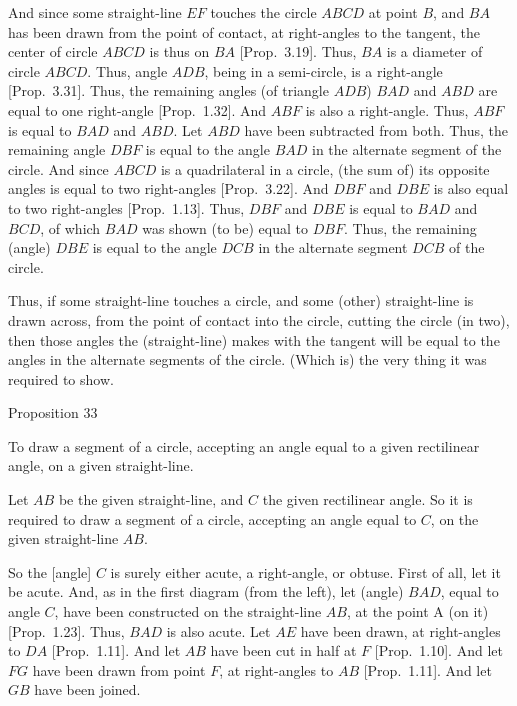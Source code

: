 And since some straight-line $EF$ touches the circle $ABCD$ at point $B$, and
$BA$ has been drawn from the point of contact, at right-angles to the
tangent, the center of circle $ABCD$ is thus on $BA$ [Prop.~3.19].
Thus, $BA$ is a diameter of circle $ABCD$.
Thus, angle $ADB$, being in a semi-circle, is a right-angle [Prop.~3.31].
Thus, the remaining angles (of triangle $ADB$) $BAD$ and $ABD$ are equal to one right-angle [Prop.~1.32]. And $ABF$ is also a right-angle. Thus,
$ABF$ is equal to $BAD$ and $ABD$. Let $ABD$ have been subtracted from both.
Thus, the remaining angle $DBF$ is equal to the angle $BAD$ in the alternate
segment of the circle. And since $ABCD$ is a quadrilateral in a circle,
(the sum of) its opposite angles is equal to two right-angles [Prop.~3.22]. And $DBF$ and $DBE$ is also equal to two right-angles [Prop.~1.13]. Thus, $DBF$ and $DBE$ is equal to $BAD$ and $BCD$, of which
$BAD$ was shown (to be) equal to $DBF$. Thus, the remaining (angle) $DBE$ is
equal to the angle $DCB$ in the alternate segment $DCB$ of the circle.

Thus, if some straight-line touches a circle, and some (other) straight-line is drawn  across, from the point of contact into the circle,  cutting the circle (in two), then those angles  the (straight-line) makes
with the tangent will be equal to the angles in
the alternate segments of the circle. (Which is) the very thing it was required to
show.


\begin{center}
{\large Proposition 33}
\end{center}

To draw a segment of a circle, accepting an angle equal to a given rectilinear angle, on a given straight-line.

\epsfysize=1.53in
\centerline{}

Let $AB$ be the given straight-line, and $C$ the given rectilinear angle. So
it is required to draw a segment of a circle, accepting an angle equal to $C$,
on the given straight-line $AB$.

So the [angle] $C$ is surely either acute, a right-angle, or obtuse. First of all,
let it be acute. And, as in the first diagram (from the left), let (angle) $BAD$,
equal to angle $C$,  have been
constructed  on the straight-line $AB$,  at the point A (on it)
[Prop.~1.23]. Thus, $BAD$ is also acute. Let $AE$ have been drawn, at
right-angles to $DA$ [Prop.~1.11]. And let $AB$ have been cut in half
at $F$ [Prop.~1.10]. And let $FG$ have been drawn from point $F$, at right-angles to $AB$
[Prop.~1.11]. And let $GB$ have been joined.

